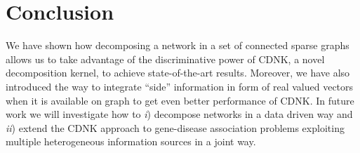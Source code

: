 \section{Conclusion}
We have shown how decomposing a network in a set of connected sparse graphs allows us to take advantage of the discriminative power of CDNK, a novel decomposition kernel, to achieve state-of-the-art results. Moreover, we have also introduced the way to integrate ``side'' information in form of real valued vectors when it is available on graph to get even better performance of CDNK. In future work we will investigate how to \textit{i}) decompose networks in a data driven way and \textit{ii}) extend the CDNK approach to gene-disease association problems exploiting multiple heterogeneous information sources in a joint way.